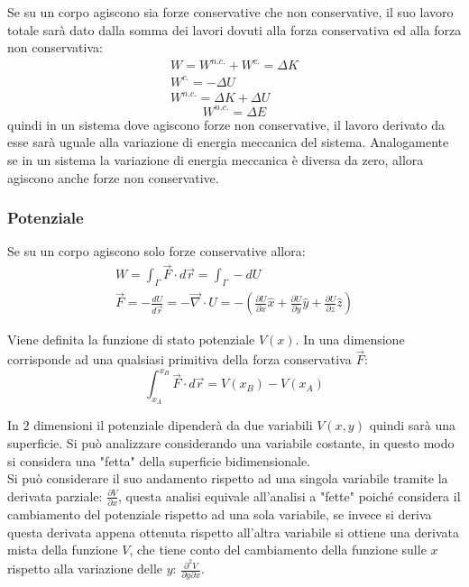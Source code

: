 \documentclass{article}
\numberwithin{equation}{subsection}
\begin{document}
Se su un corpo agiscono sia forze conservative che non 
conservative, il suo lavoro totale sarà dato dalla somma dei 
lavori dovuti alla forza conservativa ed alla forza non 
conservativa: 
\begin{gather*}
    W=W^{n.c.}+W^{c.}=\Delta K\\
    W^{c.}=-\Delta U\\
    W^{n.c.}=\Delta K +\Delta U
\end{gather*}
\begin{equation}
    W^{n.c.}=\Delta E
\end{equation}
quindi in un sistema dove agiscono forze non conservative, il 
lavoro derivato da esse sarà uguale alla variazione di energia 
meccanica del sistema. Analogamente se in un sistema la 
variazione di energia meccanica è diversa da zero, allora 
agiscono anche forze non conservative.

\subsubsection{Potenziale}


Se su un corpo agiscono solo forze conservative allora:
\begin{gather*}
    W=\int_{\Gamma}\vec{F}\cdot d\vec{r}=\int_{\Gamma}-dU\\
    \vec{F}=-\displaystyle\frac{dU}{d\vec{r}}=-\vec{\nabla}\cdot U=-\left(\displaystyle\frac{\partial U}{\partial x}\hat{x}+\frac{\partial U}{\partial y}\hat{y}+\frac{\partial U}{\partial z}\hat{z}\right)
\end{gather*} 


Viene definita la funzione di stato potenziale $V(x)$. In una dimensione corrisponde ad una qualsiasi primitiva della forza conservativa $\vec{F}$:
\begin{equation*}
    \displaystyle\int_{x_A}^{x_B}\vec{F}\cdot d\vec{r}=V(x_B)-V(x_A)
\end{equation*}



In $2$ dimensioni il potenziale dipenderà da due variabili $V(x,y)$ 
quindi sarà una superficie. Si può analizzare considerando una 
variabile costante, in questo modo si 
considera una "fetta" della superficie bidimensionale.
\\
Si può considerare il suo andamento rispetto ad una singola 
variabile tramite la derivata parziale: $\displaystyle\frac{\partial V}{\partial x}$, 
questa analisi equivale all'analisi a "fette" poiché 
considera il cambiamento del potenziale rispetto ad una sola variabile, se invece si deriva questa derivata 
appena ottenuta rispetto all'altra variabile si ottiene una derivata 
mista della funzione $V$, che tiene conto del cambiamento della 
funzione sulle $x$ rispetto alla variazione delle $y$: $\displaystyle\frac{\partial^{2} V}{\partial y\partial x}$. 
\end{document}

